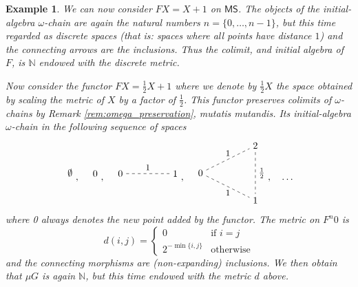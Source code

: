 \documentclass[letterpaper, 11pt, oneside]{memoir}
\theoremstyle{myteo}
\newtheorem{example}[theorem]{Example}
\numberwithin{equation}{section}
\newcommand{\MS}{\textsf{MS}}
\newcommand{\N}{\mathbb{N}}
\begin{document}
\begin{example}
  We can now consider \(FX = X + 1\) on \(\MS\).
  The objects of the initial-algebra \(\omega\)-chain are again the natural numbers \(n = \{0, \ldots, n-1\}\), but this time regarded as discrete spaces (that is: spaces where all points have distance \(1\)) and the connecting arrows are the inclusions.
  Thus the colimit, and initial algebra of \(F\), is \(\N\) endowed with the discrete metric.

  Now consider the functor \(FX = \frac{1}{2}X + 1\) where we denote by \(\frac{1}{2}X\) the space obtained by scaling the metric of \(X\) by a factor of \(\frac{1}{2}\).
  This functor preserves colimits of \(\omega\)-chains by Remark \ref{rem:omega_preservation}, mutatis mutandis.
  Its initial-algebra \(\omega\)-chain in the following sequence of spaces
  \begin{equation*}
    \begin{tikzpicture}[every node/.style={outer sep=0.5cm}]
      \node (1) at (0, 0){\(\emptyset\)};
    \end{tikzpicture},\quad
    \begin{tikzpicture}[every node/.style={outer sep=0.5cm}]
      \node (1) at (0, 0){\(0\)};
    \end{tikzpicture},\quad
    \begin{tikzpicture}
      \node (1) at (0, 0){\(0\)};
      \node (2) at (2, 0){\(1\)};
      \node (3) at (1, 0)[above]{\small 1};
      \draw[dashed] (1) to (2);
    \end{tikzpicture},\quad
    \begin{tikzpicture}[baseline=-0.25cm]
      \node (1) at (0, 0){\(0\)};
      \node (2) at (2, 1){\(2\)};
      \node (3) at (2, -1){\(1\)};
      
      \draw[dashed] (1) -- (2) node[midway, above]{\small 1};
      \draw[dashed] (1) -- (3) node[midway, below]{\small 1};
      \draw[dashed] (2) -- (3) node[midway, right]{\small \(\frac{1}{2}\)};
    \end{tikzpicture},\quad
    \ldots
  \end{equation*}
  where 0 always denotes the new point added by the functor.
  The metric on \(F^n0\) is
  \begin{equation*}
    d(i, j) =
    \begin{cases}
      0 & \text{if \(i = j\)}\\
      2^{-\min\{i, j\}} & \text{otherwise}
    \end{cases}
  \end{equation*}
  and the connecting morphisms are (non-expanding) inclusions.
  We then obtain that \(\mu G\) is again \(\N\), but this time endowed with the metric \(d\) above.
\end{example}
\end{document}
